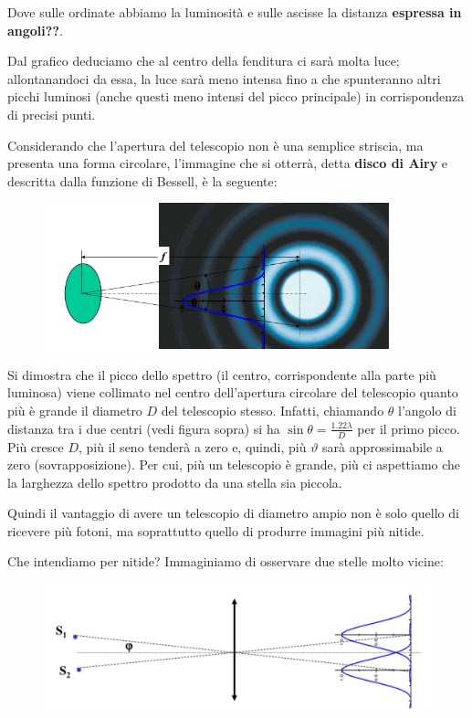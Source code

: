Dove sulle ordinate abbiamo la luminosità e sulle ascisse la distanza \textbf{espressa in angoli??}.

Dal grafico deduciamo che al centro della fenditura ci sarà molta luce; allontanandoci da essa, la luce sarà meno intensa fino a che spunteranno altri picchi luminosi (anche questi meno intensi del picco principale) in corrispondenza di precisi punti.

Considerando che l'apertura del telescopio non è una semplice striscia, ma presenta una forma circolare, l'immagine che si otterrà, detta \textbf{disco di Airy} e descritta dalla funzione di Bessell, è la seguente:

\begin{figure}[H]
    \centering
    \includegraphics[width=10cm]{WhatsApp Image 2023-01-09 at 02.59.37.jpeg}
    \label{fig:my_label10}
\end{figure}

Si dimostra che il picco dello spettro (il centro, corrispondente alla parte più luminosa) viene collimato nel centro dell'apertura circolare del telescopio quanto più è grande il diametro $D$ del telescopio stesso. Infatti, chiamando $\theta$ l'angolo di distanza tra i due centri (vedi figura sopra) si ha $\sin{\theta}=\frac{1.22\lambda}{D}$ per il primo picco. Più cresce $D$, più il seno tenderà a zero e, quindi, più $\vartheta$ sarà approssimabile a zero (sovrapposizione). Per cui, più un telescopio è grande, più ci aspettiamo che la larghezza dello spettro prodotto da una stella sia piccola.

Quindi il vantaggio di avere un telescopio di diametro ampio non è solo quello di ricevere più fotoni, ma soprattutto quello di produrre immagini più nitide.

Che intendiamo per nitide? Immaginiamo di osservare due stelle molto vicine:

\begin{figure}[H]
    \centering
    \includegraphics[width=12cm]{immagini/spettri_due_stelle.png}
\end{figure}

